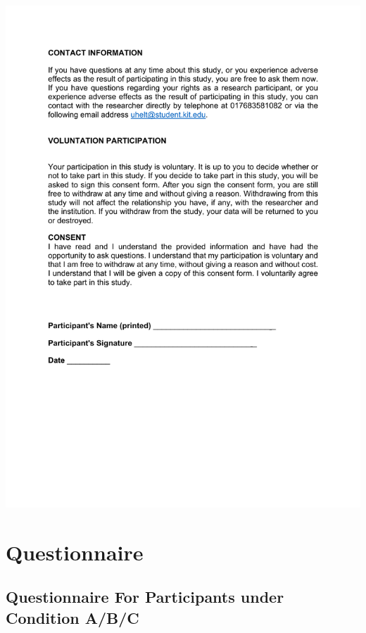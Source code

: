 	\newpage
	\includegraphics[scale=0.8]{us/ConsentForm2.pdf}
	
\section{Questionnaire}
\subsection{Questionnaire For Participants under Condition A/B/C}
